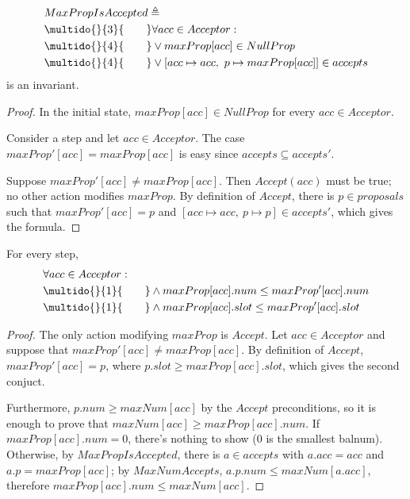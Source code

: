 \documentclass[12pt,a4paper,en]{pracamgr}
\newcommand{\ind}[1]{\multido{}{#1}{\qquad}}
\begin{document}
\begin{lemma}
    \begin{align*}
        & MaxPropIsAccepted \triangleq \\
        & \ind{3} \forall acc \in Acceptor:\\
        & \ind{4} \lor maxProp[acc] \in NullProp\\
        & \ind{4} \lor [acc \mapsto acc,\ p \mapsto maxProp[acc]] \in accepts
    \end{align*}
    is an invariant.
\end{lemma}
\begin{proof}
    In the initial state, $maxProp[acc] \in NullProp$ for every $acc \in Acceptor$.

    Consider a step and let $acc \in Acceptor$. The case $maxProp'[acc] = maxProp[acc]$ is easy since $accepts \subseteq accepts'$.

    Suppose $maxProp'[acc] \neq maxProp[acc]$. Then $Accept(acc)$ must be true; no other action modifies $maxProp$. By definition of $Accept$, there is $p \in proposals$ such that $maxProp'[acc] = p$ and $[acc \mapsto acc,\ p \mapsto p] \in accepts'$, which gives the formula.
\end{proof}

\begin{lemma}\label{maxPropGrows}
    For every step,
    \begin{align*}
        & \forall acc \in Acceptor:\\
        & \ind{1} \land maxProp[acc].num \le maxProp'[acc].num\\
        & \ind{1} \land maxProp[acc].slot \le maxProp'[acc].slot
    \end{align*}
\end{lemma}
\begin{proof}
    The only action modifying $maxProp$ is $Accept$. Let $acc \in Acceptor$ and suppose that $maxProp'[acc] \neq maxProp[acc]$. By definition of $Accept$, $maxProp'[acc] = p$, where $p.slot \ge maxProp[acc].slot$, which gives the second conjuct.

    Furthermore, $p.num \ge maxNum[acc]$ by the $Accept$ preconditions, so it is enough to prove that $maxNum[acc] \ge maxProp[acc].num$. If $maxProp[acc].num = 0$, there's nothing to show ($0$ is the smallest balnum). Otherwise, by $MaxPropIsAccepted$, there is $a \in accepts$ with $a.acc = acc$ and $a.p = maxProp[acc]$; by $MaxNumAccepts$, $a.p.num \le maxNum[a.acc]$, therefore $maxProp[acc].num \le maxNum[acc]$.
\end{proof}
\end{document}
